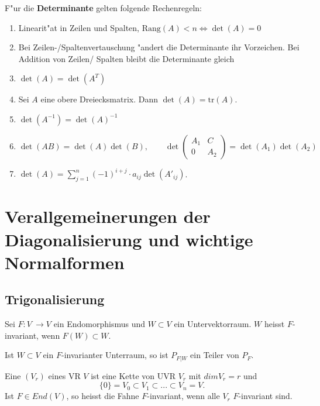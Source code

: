 \documentclass[8pt, a4paper, twocolumn, landscape]{article}
\begin{document}
\begin{theorem}
F"ur die \textbf{Determinante} gelten folgende Rechenregeln:
\begin{enumerate}
\item Linearit"at in Zeilen und Spalten, $\mathrm{Rang}(A) < n \Leftrightarrow \det (A) = 0 $
\item Bei Zeilen-/Spaltenvertauschung "andert die Determinante ihr Vorzeichen. Bei Addition von Zeilen/ Spalten bleibt die Determinante gleich
\item $\det (A) = \det (A^T)$
\item Sei $A$ eine obere Dreiecksmatrix. Dann $\det(A) = \mathrm{tr}(A)$.
\item $\det (A^{-1}) = \det (A)^{-1}$
\item $\det(AB) = \det (A) \det(B), \qquad \det \left( \begin{array}{cc} A_1 & C \\ 0 & A_2 \end{array} \right) = \det (A_1) \det (A_2)$
\item $\det (A) = \sum_{j = 1}^n (-1)^{i + j} \cdot a_{ij} \det (A'_{ij})$.
\end{enumerate}
\end{theorem}




\section{Verallgemeinerungen der Diagonalisierung und wichtige Normalformen}

\subsection{Trigonalisierung} %
\begin{definition}
Sei $F : V\ \rightarrow V$ ein Endomorphismus und $W \subset V$ ein Untervektorraum. $W$ heisst $F$-invariant, wenn $F(W) \subset W$.
\end{definition}
\begin{remark}
Ist $W \subset V$ ein $F$-invarianter Unterraum, so ist $P_{F|W}$ ein Teiler von $P_F$.
\end{remark}
\begin{definition}
Eine  $(V_r)$ eines VR $V$ ist eine Kette von UVR $V_r$ mit $dim V_r = r$ und
$$\{0\} = V_0 \subset V_1 \subset ... \subset V_n = V.$$
Ist $F \in End(V)$, so heisst die Fahne $F$-invariant, wenn alle $V_r$ $F$-invariant sind.
\end{definition}
\end{document}
